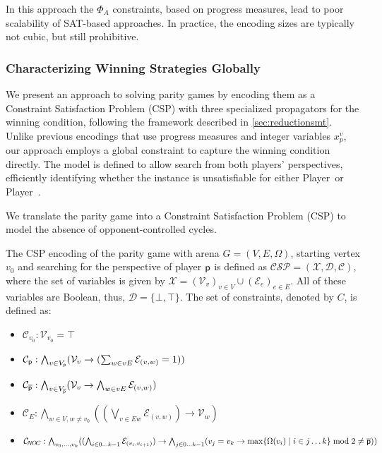 \documentclass{article}
\begin{document}
In this approach the $\Phi_A$ constraints, based on progress measures, lead to poor scalability of SAT-based approaches. In practice, the encoding sizes are typically not cubic, but still prohibitive. 

\subsubsection{Characterizing Winning Strategies Globally}

We present an approach to solving parity games by encoding them as a Constraint Satisfaction Problem (CSP) with three specialized propagators for the winning condition, following the framework described in \ref{sec:reductionsmt}. Unlike previous encodings that use progress measures and integer variables $x_p^v$, our approach employs a global constraint to capture the winning condition directly. The model is defined to allow search from both players’ perspectives, efficiently identifying whether the instance is unsatisfiable for either Player~\even or Player~\odd.

We translate the parity game into a Constraint Satisfaction Problem (CSP) to model the absence of opponent-controlled cycles.

\begin{definition}\label{def:csp}
    The CSP encoding of the parity game with arena $G=(V,E,\Omega)$, starting vertex $v_0$ and searching for the perspective of player $\player$ is defined as $\mathcal{CSP = (X, D, C)}$, where the set of variables is given by $\mathcal{X} = (\mathcal{V}_v)_{v \in V} \cup (\mathcal{E}_e)_{e \in E}$. All of these variables are Boolean, thus, $\mathcal{D} = \{\bot,\top\}$. The set of constraints, denoted by $C$, is defined as:
    \begin{itemize}
        \item $\mathcal{C}_{v_0} : \mathcal{V}_{v_0} = \top$
        \item $\mathcal{C}_{\player} : \bigwedge_{v \in V_{\player}} (\mathcal{V}_v \rightarrow (\sum_{w \in vE} \mathcal{E}_{(v,w)}= 1))$
        \item $\mathcal{C}_{\opponent} : \bigwedge_{v \in V_{\opponent}} (\mathcal{V}_v \rightarrow \bigwedge_{w \in vE} \mathcal{E}_{(v,w)})$
        \item $\mathcal{C}_{\!E} : \bigwedge_{w \in V, w \neq v_0} ((\bigvee_{v \in Ew} \mathcal{E}_{(v,w)}) \rightarrow \mathcal{V}_w)$
        \item $\mathcal{C}_{\!N\!O\!C} : \bigwedge_{v_0, \dots, v_k} ((\bigwedge_{i\in 0\dots k-1} \mathcal{E}_{(v_i,v_{i+1})}) \rightarrow \bigwedge_{j\in 0\dots k-1} (v_j=v_k \rightarrow \max\{\Omega(v_i) \mid i\in j\dots k\} \bmod 2 \ne \opponent))$
    \end{itemize}
\end{definition}
\end{document}
